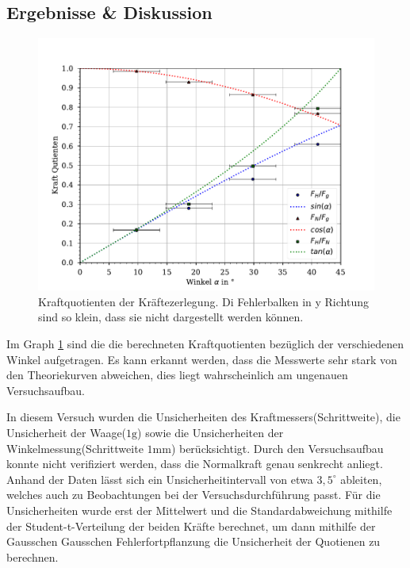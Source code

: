 \documentclass[11pt, a4paper]{article}
\begin{document}
    \subsection{Ergebnisse \& Diskussion}
    \begin{figure}
        \centering
        \includegraphics[width=\textwidth]{./5Kraftzer.pdf}

        \caption{Kraftquotienten der Kräftezerlegung. Di Fehlerbalken in y Richtung sind so klein, dass sie nicht dargestellt werden können.}
        \label{fig:Kraftzer}
    \end{figure}
    Im Graph \ref{fig:Kraftzer} sind die die berechneten Kraftquotienten bezüglich der verschiedenen Winkel aufgetragen.
    Es kann erkannt werden, dass die Messwerte sehr stark von den Theoriekurven abweichen, dies liegt wahrscheinlich
    am ungenauen Versuchsaufbau.
    
    In diesem Versuch wurden die Unsicherheiten des Kraftmessers(Schrittweite), die Unsicherheit der Waage($1\si{\gram}$)
    sowie die Unsicherheiten der Winkelmessung(Schrittweite $1 \si{\milli\metre}$) berücksichtigt.
    Durch den Versuchsaufbau konnte nicht verifiziert werden, dass die Normalkraft genau senkrecht anliegt.
    Anhand der Daten lässt sich ein Unsicherheitintervall von etwa $3,5^{\circ}$ ableiten, welches auch zu
    Beobachtungen bei der Versuchsdurchführung passt. Für die Unsicherheiten wurde erst der Mittelwert \cite[(29)]{ABW}
    und die Standardabweichung mithilfe der Student-t-Verteilung \cite[(15)]{ABW} der beiden Kräfte berechnet, um dann mithilfe der Gausschen
    Gausschen Fehlerfortpflanzung \cite[(19)]{ABW} die Unsicherheit der Quotienen zu berechnen.
\end{document}
